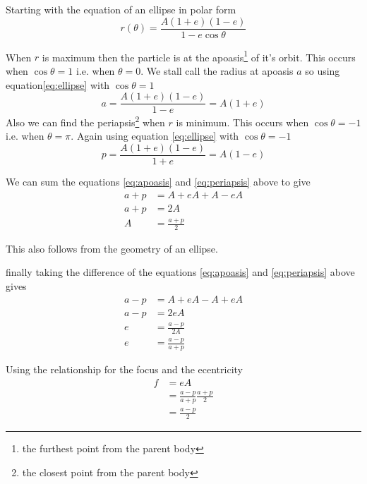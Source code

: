 Starting with the equation of an ellipse in polar form
\begin{equation} \label{eq:ellipse}
r(\theta)=\frac{A(1+e)(1-e)}{1-e \cos \theta}
\end{equation}

When $r$ is maximum then the particle is at the apoasis\footnote{the furthest point from the parent body} of it's orbit. This occurs when $\cos \theta=1$ i.e. when $\theta=0$.
We stall call the radius at apoasis $a$ so using equation\ref{eq:ellipse} with $\cos \theta=1$
\begin{equation} \label{eq:apoasis}
a=\frac{A(1+e)(1-e)}{1-e}=A(1+e)
\end{equation}
Also we can find the periapsis\footnote{the closest point from the parent body} when $r$ is minimum. This occurs when $\cos \theta=-1$ i.e. when $\theta=\pi$. Again using equation \ref{eq:ellipse} with $\cos \theta=-1$
\begin{equation} \label{eq:periapsis}
p=\frac{A(1+e)(1-e)}{1+e}=A(1-e)
\end{equation}

We can sum the equations \ref{eq:apoasis} and \ref{eq:periapsis} above to give 
\begin{align}
a+p&=A+eA+A-eA \nonumber \\
a+p&=2A \nonumber \\
A&=\frac{a+p}{2}\label{eq:ApoPeri:semiMajorAxis}
\end{align}

This also follows from the geometry of an ellipse.

finally taking the difference of the equations \ref{eq:apoasis} and \ref{eq:periapsis} above gives
\begin{align}
a-p&=A+eA-A+eA \nonumber \\
a-p&=2eA \nonumber \\
e&=\frac{a-p}{2A} \nonumber \\
e&=\frac{a-p}{a+p} \label{eq:ApoPeri:ecentricity}
\end{align}

Using the relationship for the focus and the ecentricity
\begin{align}
f&=eA\nonumber \\
&=\frac{a-p}{a+p}\frac{a+p}{2} \nonumber \\
&=\frac{a-p}{2}
\end{align}

